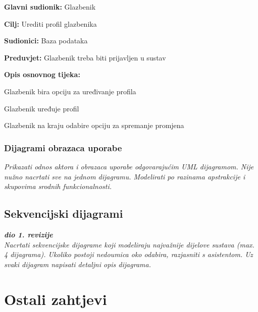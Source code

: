 	\noindent {}
	\begin{packed_item}
		
		\item \textbf{Glavni sudionik: } Glazbenik
		\item  \textbf{Cilj:} Urediti profil glazbenika
		\item  \textbf{Sudionici:} Baza podataka
		\item  \textbf{Preduvjet:} Glazbenik treba biti prijavljen u sustav
		\item  \textbf{Opis osnovnog tijeka:}
		
		\item[] \begin{packed_enum}
			
			\item Glazbenik bira opciju za uređivanje profila
			\item Glazbenik uređuje profil
			\item Glazbenik na kraju odabire opciju za spremanje promjena
		\end{packed_enum}
		
		
	\end{packed_item}
		
				
				\subsubsection{Dijagrami obrazaca uporabe}
				
				
				
					
					\textit{Prikazati odnos aktora i obrazaca uporabe odgovarajućim UML dijagramom. Nije nužno nacrtati sve na jednom dijagramu. Modelirati po razinama apstrakcije i skupovima srodnih funkcionalnosti.}
				\eject				
				
				
			\subsection{Sekvencijski dijagrami}
				
				\textbf{\textit{dio 1. revizije}}\\
				
				\textit{Nacrtati sekvencijske dijagrame koji modeliraju najvažnije dijelove sustava (max. 4 dijagrama). Ukoliko postoji nedoumica oko odabira, razjasniti s asistentom. Uz svaki dijagram napisati detaljni opis dijagrama.}
				\eject
	
		\section{Ostali zahtjevi}
		
